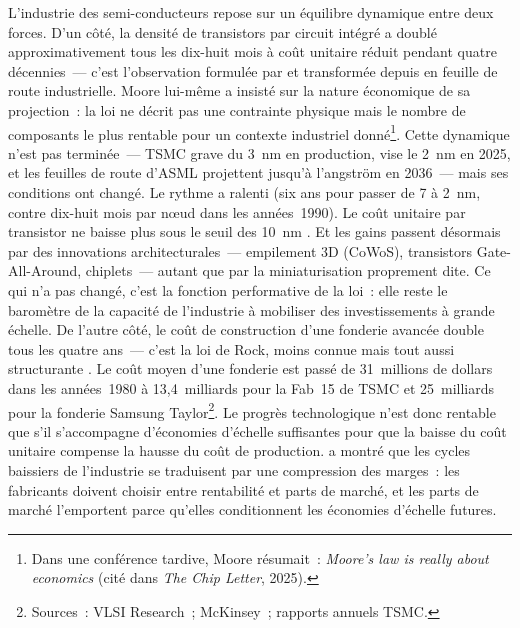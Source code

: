 L'industrie des semi-conducteurs repose sur un équilibre dynamique entre deux forces. D'un côté, la densité de transistors par circuit intégré a doublé approximativement tous les dix-huit mois à coût unitaire réduit pendant quatre décennies~--- c'est l'observation formulée par \textcite{moore_cramming_1965} et transformée depuis en feuille de route industrielle. Moore lui-même a insisté sur la nature économique de sa projection~: la loi ne décrit pas une contrainte physique mais le nombre de composants le plus rentable pour un contexte industriel donné\footnote{Dans une conférence tardive, Moore résumait~: \og \emph{Moore's law is really about economics}\fg{} (cité dans \emph{The Chip Letter}, 2025).}. Cette dynamique n'est pas terminée~--- TSMC grave du 3~nm en production, vise le 2~nm en 2025, et les feuilles de route d'ASML projettent jusqu'à l'angström en 2036~--- mais ses conditions ont changé. Le rythme a ralenti (six ans pour passer de 7 à 2~nm, contre dix-huit mois par nœud dans les années~1990). Le coût unitaire par transistor ne baisse plus sous le seuil des 10~nm \parencite{pirson_environmental_2022}. Et les gains passent désormais par des innovations architecturales~--- empilement 3D (CoWoS), transistors Gate-All-Around, chiplets~--- autant que par la miniaturisation proprement dite. Ce qui n'a pas changé, c'est la fonction performative de la loi~: elle reste le baromètre de la capacité de l'industrie à mobiliser des investissements à grande échelle. De l'autre côté, le coût de construction d'une fonderie avancée double tous les quatre ans~--- c'est la loi de Rock, moins connue mais tout aussi structurante \parencite{ross_moores_1995}. Le coût moyen d'une fonderie est passé de 31~millions de dollars dans les années~1980 à 13,4~milliards pour la Fab~15 de TSMC et 25~milliards pour la fonderie Samsung Taylor\footnote{Sources~: VLSI Research~; McKinsey~; rapports annuels TSMC.}. Le progrès technologique n'est donc rentable que s'il s'accompagne d'économies d'échelle suffisantes pour que la baisse du coût unitaire compense la hausse du coût de production. \textcite{gruber_semiconductor_1996} a montré que les cycles baissiers de l'industrie se traduisent par une compression des marges~: les fabricants doivent choisir entre rentabilité et parts de marché, et les parts de marché l'emportent parce qu'elles conditionnent les économies d'échelle futures.

